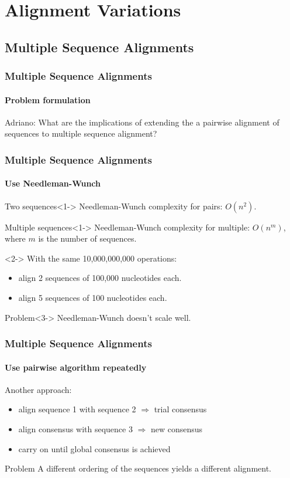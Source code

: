 \documentclass{beamer}
\begin{document}
\section{Alignment Variations}

\subsection{Multiple Sequence Alignments}

\begin{frame}
  \frametitle{Multiple Sequence Alignments}
  \framesubtitle{Problem formulation}

  \begin{block}{Adriano:}
    What are the implications of extending the \alert{a pairwise} alignment
    of sequences to \alert{multiple} sequence alignment?
  \end{block}
\end{frame}

\begin{frame}
  \frametitle{Multiple Sequence Alignments}
  \framesubtitle{Use Needleman-Wunch}

  \begin{block}{Two sequences}<1->
    Needleman-Wunch complexity for pairs: \alert{$O(n^2)$}.
  \end{block}
  \begin{block}{Multiple sequences}<1->
    Needleman-Wunch complexity for multiple: \alert{$O(n^m)$}, where $m$ is the
    number of sequences.
  \end{block}
  \begin{example}<2->
    With the same 10,000,000,000 operations:
    \begin{itemize}
      \item align 2 sequences of 100,000 nucleotides each.
      \item align 5 sequences of 100 nucleotides each.
    \end{itemize}
  \end{example}
  \begin{block}{Problem}<3->
    Needleman-Wunch doesn't scale well.
  \end{block}
\end{frame}

\begin{frame}
  \frametitle{Multiple Sequence Alignments}
  \framesubtitle{Use pairwise algorithm repeatedly}

  Another approach:
  \begin{itemize}
    \item align sequence 1 with sequence 2 $\Rightarrow$ trial consensus
    \item align consensus with sequence 3 $\Rightarrow$ new consensus
    \item carry on until global consensus is achieved
  \end{itemize}

  \pause

  \begin{block}{Problem}
    A different ordering of the sequences yields a different alignment.
  \end{block}
\end{frame}
\end{document}

